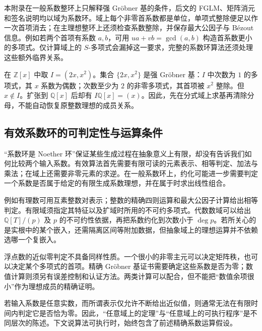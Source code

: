 \ProseParagraphBreak
本附录在一般系数整环上只解释强 Gröbner 基的条件，后文的 FGLM、矩阵消元和签名说明均以域为系数环。域上每个非零首系数都是单位，单项式整除便足以作一次首项消去；在主理想整环上还须检查系数整除，并保存最大公因子与 Bézout 信息。例如若两个首项有系数 \(a,b\)，可用 \(ua+vb=\gcd(a,b)\) 构造首系数更小的多项式。仅计算域上的 \(S\)-多项式会漏掉这一要求，完整的系数环算法还须处理这些额外临界关系。

\begin{example}\label{b3:exm:B-integer-coefficients}
	在 \(\mathbb Z[x]\) 中取 \(I=(2x,x^2)\)。集合 \(\{2x,x^2\}\) 是强 Gröbner 基：\(I\) 中次数为 \(1\) 的多项式，其 \(x\) 系数为偶数；次数至少为 \(2\) 的非零多项式，其首项被 \(x^2\) 整除。但 \(x\notin I\)。扩张到 \(\mathbb Q[x]\) 后却有 \(I\mathbb Q[x]=(x)\)。因此，先在分式域上求基再清除分母，不能自动恢复原整数理想的成员关系。
\end{example}

\subsection{有效系数环的可判定性与运算条件}
\label{b3:subsec:B01:03}

“系数环是 Noether 环”保证某些生成过程在抽象意义上有限，却没有告诉我们如何比较两个输入系数。有效算法首先需要有限可读的元素表示、相等判定、加法与乘法；在域上还需要非零元素的求逆。在一般系数环上，约化可能进一步需要判定一个系数是否属于给定的有限生成系数理想，并在属于时求出线性组合。

\ProseParagraphBreak
例如有理数可用互素整数对表示；整数的精确四则运算和最大公因子计算给出相等判定。有限域须指定其特征以及扩域时所用的不可约多项式。代数数域可以给出 \(\mathbb Q[T]/(p)\) 及 \(p\) 的不可约性依据，再把系数约化到次数小于 \(\deg p\)。若所关心的是实根中的某个嵌入，还需隔离区间等附加数据，但抽象域上的理想运算并不依赖选哪一个复嵌入。

\ProseParagraphBreak
浮点数的近似零判定不具备同样性质。一个很小的非零主元可以决定矩阵秩，也可以决定某个多项式的首项。精确 Gröbner 基证书需要确定这些系数是否为零；数值计算则须另有误差控制和认证方法。两类计算可以配合，但不能把“数值余项很小”作为理想成员的精确证明。

\begin{remark}
	若输入系数是任意实数，而所谓表示仅允许不断给出近似值，则通常无法在有限时间内判定它是否恰为零。因此，“任意域上的定理”与“任意域上的可执行程序”是不同层次的陈述。下文说算法可执行时，始终包含了前述精确系数运算假设。
\end{remark}

